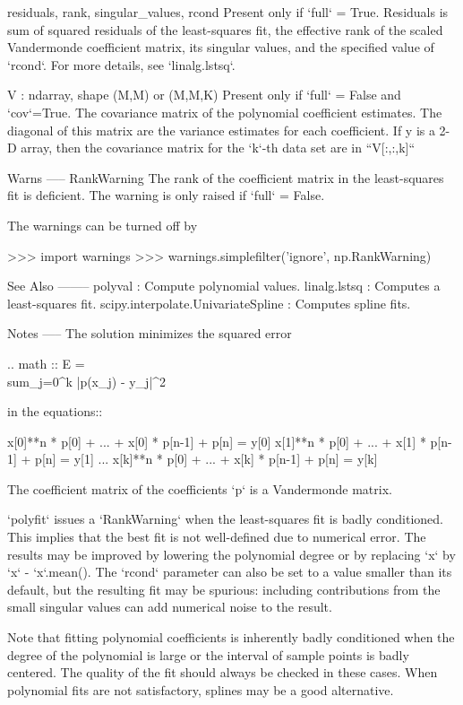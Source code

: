 \begin{DoxyVerb}
residuals, rank, singular_values, rcond
    Present only if `full` = True.  Residuals is sum of squared residuals
    of the least-squares fit, the effective rank of the scaled Vandermonde
    coefficient matrix, its singular values, and the specified value of
    `rcond`. For more details, see `linalg.lstsq`.

V : ndarray, shape (M,M) or (M,M,K)
    Present only if `full` = False and `cov`=True.  The covariance
    matrix of the polynomial coefficient estimates.  The diagonal of
    this matrix are the variance estimates for each coefficient.  If y
    is a 2-D array, then the covariance matrix for the `k`-th data set
    are in ``V[:,:,k]``


Warns
-----
RankWarning
    The rank of the coefficient matrix in the least-squares fit is
    deficient. The warning is only raised if `full` = False.

    The warnings can be turned off by

    >>> import warnings
    >>> warnings.simplefilter('ignore', np.RankWarning)

See Also
--------
polyval : Compute polynomial values.
linalg.lstsq : Computes a least-squares fit.
scipy.interpolate.UnivariateSpline : Computes spline fits.

Notes
-----
The solution minimizes the squared error

.. math ::
    E = \\sum_{j=0}^k |p(x_j) - y_j|^2

in the equations::

    x[0]**n * p[0] + ... + x[0] * p[n-1] + p[n] = y[0]
    x[1]**n * p[0] + ... + x[1] * p[n-1] + p[n] = y[1]
    ...
    x[k]**n * p[0] + ... + x[k] * p[n-1] + p[n] = y[k]

The coefficient matrix of the coefficients `p` is a Vandermonde matrix.

`polyfit` issues a `RankWarning` when the least-squares fit is badly
conditioned. This implies that the best fit is not well-defined due
to numerical error. The results may be improved by lowering the polynomial
degree or by replacing `x` by `x` - `x`.mean(). The `rcond` parameter
can also be set to a value smaller than its default, but the resulting
fit may be spurious: including contributions from the small singular
values can add numerical noise to the result.

Note that fitting polynomial coefficients is inherently badly conditioned
when the degree of the polynomial is large or the interval of sample points
is badly centered. The quality of the fit should always be checked in these
cases. When polynomial fits are not satisfactory, splines may be a good
alternative.


\end{DoxyVerb}
